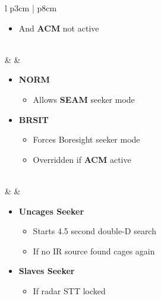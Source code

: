\documentclass[8pt,usenames,dvipsnames,twoside]{article}
\begin{document}
\begin{center}
\begin{longtable}{l p{3cm} | p{8cm}}
\begin{minipage}[t]{\linewidth}
\begin{itemize}
\begin{itemize}
							\item And \textbf{ACM} not active
						\end{itemize}
					\end{itemize}
				\end{minipage} \\
				\midrule
				\textbullet &   & 
				\begin{minipage}[t]{\linewidth}
					\vspace{-7pt}
					\begin{itemize}
						\item \textbf{NORM}
						\begin{itemize}
							\item Allows \textbf{SEAM} seeker mode
						\end{itemize}
						\item \textbf{BRSIT}
						\begin{itemize}
							\item Forces Boresight seeker mode
							\item Overridden if \textbf{ACM} active
						\end{itemize}
					\end{itemize}
				\end{minipage} \\
				\midrule
				\textbullet &   \hfill\null {} & 
				\begin{minipage}[t]{\linewidth}
					\vspace{-7pt}
					\begin{itemize}
						\item \textbf{Uncages Seeker}
						\begin{itemize}
							\item Starts 4.5 second double-D search
							\item If no IR source found cages again
						\end{itemize}
						\item \textbf{Slaves Seeker}
						\begin{itemize}
							\item If radar STT locked
						\end{itemize}
					\end{itemize}
				\end{minipage} \\
				\bottomrule
			\end{longtable}
		\end{center}
	
\end{document}
